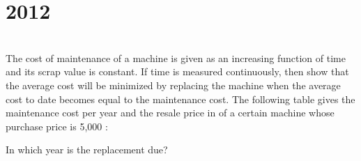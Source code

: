 \section*{2012}
\vspace{-.5cm}
\hrulefill \smallskip\\
 The cost of maintenance of a machine is given as an increasing function of time and its scrap value is constant. If time is measured continuously, then show that the average cost will be minimized by replacing the machine when the average cost to date becomes equal to the maintenance cost.
\myline
{} The following table gives the maintenance cost per year and the resale price in \textbf{\rupee} of a certain machine whose purchase price is \textbf{\rupee} 5,000 :
\begin{center}
\end{center}
In which year is the replacement due?